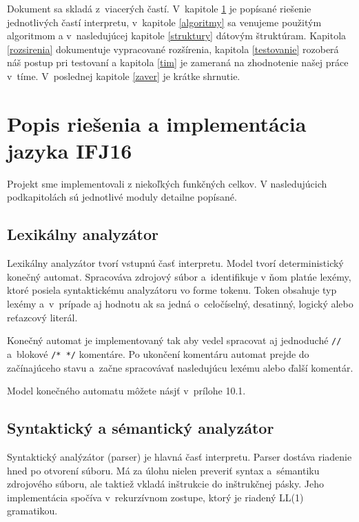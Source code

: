\documentclass[11pt,a4paper]{article}
\begin{document}
Dokument sa skladá z~viacerých častí. V~kapitole \ref{popis} je popísané riešenie jednotlivých častí interpretu, v~kapitole \ref{algoritmy} sa venujeme použitým algoritmom a v~nasledujúcej kapitole \ref{struktury} dátovým štruktúram. Kapitola \ref{rozsirenia} dokumentuje vypracované rozšírenia, kapitola \ref{testovanie} rozoberá náš postup pri testovaní a kapitola \ref{tim} je zameraná na zhodnotenie našej práce v~tíme. V~poslednej kapitole \ref{zaver} je krátke shrnutie.

\section{Popis riešenia a implementácia jazyka IFJ16}
\label{popis}

Projekt sme implementovali z niekoľkých funkčných celkov. V nasledujúcich podkapitolách sú jednotlivé moduly detailne popísané.

    \subsection{Lexikálny analyzátor}
    \label{lexer}
    Lexikálny analyzátor tvorí vstupnú časť interpretu. Model tvorí deterministický konečný automat.
    Spracováva zdrojový súbor a~identifikuje v ňom platńe lexémy, ktoré posiela syntaktickému analyzátoru vo forme tokenu.
    Token obsahuje typ lexémy a~v~prípade aj hodnotu ak sa jedná o~celočíselný, desatinný, logický alebo reťazcový literál.

    Konečný automat je implementovaný tak aby vedel spracovat aj jednoduché \texttt{//} a~blokové \texttt{/* */} komentáre.
    Po ukončení komentáru  automat prejde do začínajúceho stavu a~začne spracovávať nasledujúcu lexému alebo ďalší komentár.

    Model konečného automatu môžete násjť v~prílohe 10.1. %


    \subsection{Syntaktický a sémantický analyzátor}
    \label{parser}
    Syntaktický analýzátor (parser) je hlavná časť interpretu. Parser dostáva riadenie hned po otvorení súboru. Má za úlohu nielen
    preveriť syntax a~sémantiku zdrojového súboru, ale taktiež vkladá inštrukcie do inštrukčnej pásky. Jeho implementácia spočíva
    v~rekurzívnom zostupe, ktorý je riadený LL(1) gramatikou. %
\end{document}
